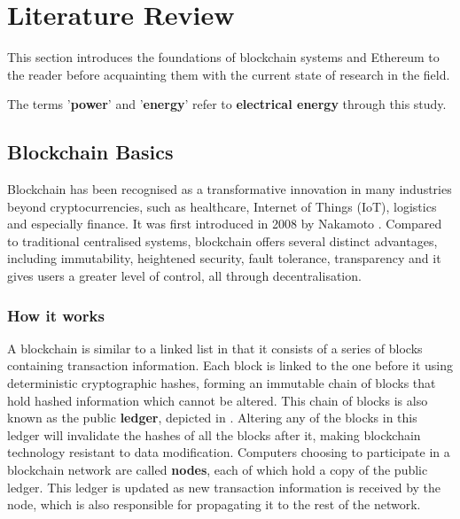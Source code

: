 \chapter{Literature Review}

This section introduces the foundations of blockchain systems and Ethereum to the reader before acquainting them with the current state of research in the field.

The terms '\textbf{power}' and '\textbf{energy}' refer to \textbf{electrical energy} through this study. 


\section{Blockchain Basics}

Blockchain has been recognised as a transformative innovation in many industries beyond cryptocurrencies, such as  healthcare, Internet of Things (IoT), logistics and especially finance. It was first introduced in 2008 by Nakamoto \cite{NakamotoBitcoin:System}. Compared to traditional centralised systems, blockchain offers several distinct advantages, including immutability, heightened security, fault tolerance, transparency and it gives users a greater level of control, all through decentralisation.

\subsection{How it works}

A blockchain is similar to a linked list in that it consists of a series of blocks containing transaction information. Each block is linked to the one before it using deterministic cryptographic hashes, forming an immutable chain of blocks that hold hashed information which cannot be altered. This chain of blocks is also known as the public \textbf{ledger}, depicted in . Altering any of the blocks in this ledger will invalidate the hashes of all the blocks after it, making blockchain technology resistant to data modification. Computers choosing to participate in a blockchain network are called \textbf{nodes}, each of which hold a copy of the public ledger. This ledger is updated as new transaction information is received by the node, which is also responsible for propagating it to the rest of the network.

